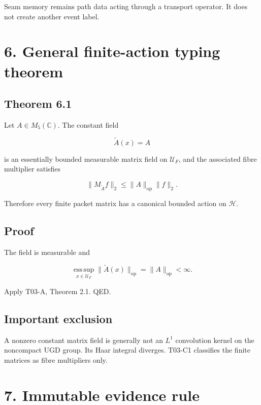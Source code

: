 Seam memory remains path data acting through a transport operator. It does not
create another event label.

\hypertarget{general-finite-action-typing-theorem}{%
\section{6. General finite-action typing theorem}\label{general-finite-action-typing-theorem}}

\hypertarget{theorem-6.1}{%
\subsection{Theorem 6.1}\label{theorem-6.1}}

Let \(A\in M_5(\mathbb C)\). The constant field

\[
\widetilde A(x)=A
\]

is an essentially bounded measurable matrix field on \(\mathcal U_F\), and the
associated fibre multiplier satisfies

\[
\|M_{\widetilde A}f\|_2
\le
\|A\|_{\mathrm{op}}\|f\|_2.
\]

Therefore every finite packet matrix has a canonical bounded action on
\(\mathcal H\).

\hypertarget{proof}{%
\subsection{Proof}\label{proof}}

The field is measurable and

\[
\operatorname*{ess\,sup}_{x\in\mathcal U_F}
\|\widetilde A(x)\|_{\mathrm{op}}
=
\|A\|_{\mathrm{op}}<\infty.
\]

Apply T03-A, Theorem 2.1. QED.

\hypertarget{important-exclusion}{%
\subsection{Important exclusion}\label{important-exclusion}}

A nonzero constant matrix field is generally not an \(L^1\) convolution kernel
on the noncompact UGD group. Its Haar integral diverges. T03-C1 classifies the
finite matrices as fibre multipliers only.

\hypertarget{immutable-evidence-rule}{%
\section{7. Immutable evidence rule}\label{immutable-evidence-rule}}

